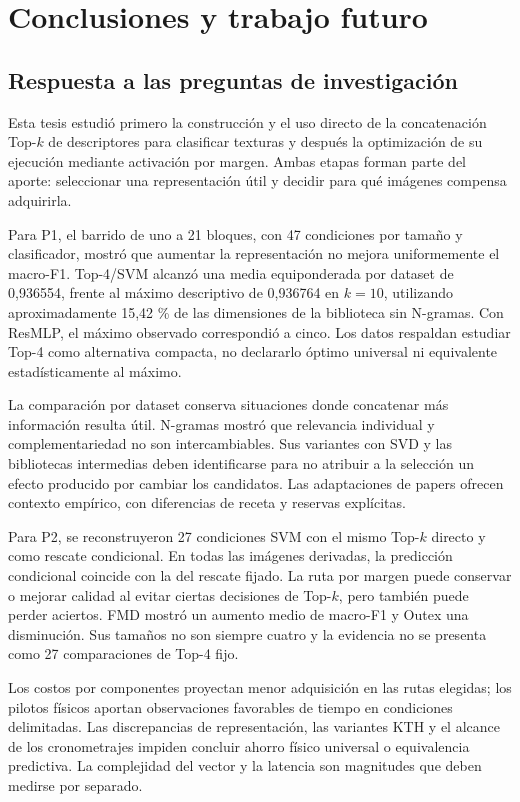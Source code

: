 \chapter{Conclusiones y trabajo futuro}\label{sec:conclusion}

\section{Respuesta a las preguntas de investigación}
Esta tesis estudió primero la construcción y el uso directo de la concatenación Top-\(k\) de descriptores para clasificar texturas y después la optimización de su ejecución mediante activación por margen. Ambas etapas forman parte del aporte: seleccionar una representación útil y decidir para qué imágenes compensa adquirirla.

Para P1, el barrido de uno a 21 bloques, con 47 condiciones por tamaño y clasificador, mostró que aumentar la representación no mejora uniformemente el macro-F1. Top-4/SVM alcanzó una media equiponderada por dataset de 0,936554, frente al máximo descriptivo de 0,936764 en \(k=10\), utilizando aproximadamente 15,42 \% de las dimensiones de la biblioteca sin N-gramas. Con ResMLP, el máximo observado correspondió a cinco. Los datos respaldan estudiar Top-4 como alternativa compacta, no declararlo óptimo universal ni equivalente estadísticamente al máximo.

La comparación por dataset conserva situaciones donde concatenar más información resulta útil. N-gramas mostró que relevancia individual y complementariedad no son intercambiables. Sus variantes con SVD y las bibliotecas intermedias deben identificarse para no atribuir a la selección un efecto producido por cambiar los candidatos. Las adaptaciones de papers ofrecen contexto empírico, con diferencias de receta y reservas explícitas.

Para P2, se reconstruyeron 27 condiciones SVM con el mismo Top-\(k\) directo y como rescate condicional. En todas las imágenes derivadas, la predicción condicional coincide con la del rescate fijado. La ruta por margen puede conservar o mejorar calidad al evitar ciertas decisiones de Top-\(k\), pero también puede perder aciertos. FMD mostró un aumento medio de macro-F1 y Outex una disminución. Sus tamaños no son siempre cuatro y la evidencia no se presenta como 27 comparaciones de Top-4 fijo.

Los costos por componentes proyectan menor adquisición en las rutas elegidas; los pilotos físicos aportan observaciones favorables de tiempo en condiciones delimitadas. Las discrepancias de representación, las variantes KTH y el alcance de los cronometrajes impiden concluir ahorro físico universal o equivalencia predictiva. La complejidad del vector y la latencia son magnitudes que deben medirse por separado.

